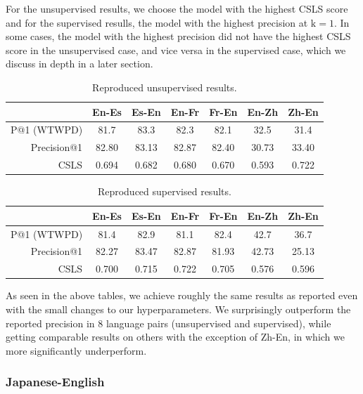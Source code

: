\documentclass{article}
\begin{document}
For the unsupervised results, we choose the model with the highest CSLS score
and for the supervised resulls, the model with the highest precision at
$\text{k}=1$. In some cases, the model with the highest precision did not have
the highest CSLS score in the unsupervised case, and vice versa in the supervised
case, which we discuss in depth in a later section.

\begin{table}[h]
  \centering
  \begin{tabular}{r|cc|cc|cc}
    \toprule
    & En-Es & Es-En & En-Fr & Fr-En & En-Zh & Zh-En \\
    \midrule
    P@1 (WTWPD) & 81.7  & 83.3  & 82.3  & 82.1  & 32.5  & 31.4  \\
    \midrule
    Precision@1 & 82.80 & 83.13 & 82.87 & 82.40 & 30.73 & 33.40 \\
    CSLS        & 0.694 & 0.682 & 0.680 & 0.670 & 0.593 & 0.722 \\
    \bottomrule
  \end{tabular}
  \caption{Reproduced unsupervised results.}
\end{table}

\begin{table}[h]
  \centering
  \begin{tabular}{r|cc|cc|cc}
    \toprule
    & En-Es & Es-En & En-Fr & Fr-En & En-Zh & Zh-En \\
    \midrule
    P@1 (WTWPD) & 81.4  & 82.9  & 81.1  & 82.4  & 42.7  & 36.7  \\
    \midrule
    Precision@1 & 82.27 & 83.47 & 82.87 & 81.93 & 42.73 & 25.13 \\
    CSLS        & 0.700 & 0.715 & 0.722 & 0.705 & 0.576 & 0.596 \\
    \bottomrule
  \end{tabular}
  \caption{Reproduced supervised results.}
\end{table}

As seen in the above tables, we achieve roughly the same results as reported even
with the small changes to our hyperparameters. We surprisingly outperform the
reported precision in 8 language pairs (unsupervised and supervised), while getting
comparable results on others with the exception of Zh-En, in which we more 
significantly underperform.

\subsubsection*{Japanese-English}
\end{document}
